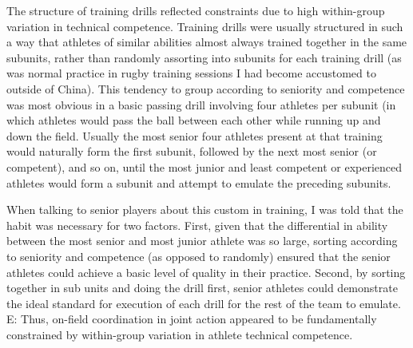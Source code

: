 \begin{CJK}{UTF8}{gbsn}
The structure of training drills reflected constraints due to high within-group variation in technical competence.  Training drills were usually structured in such a way that athletes of similar abilities almost always trained together in the same subunits, rather than randomly assorting into subunits for each training drill (as was normal practice in rugby training sessions I had become accustomed to outside of China).  This tendency to group according to seniority and competence was most obvious in a basic passing drill involving four athletes per subunit (in which athletes would pass the ball between each other while running up and down the field.  Usually the most senior four athletes present at that training would naturally form the first subunit, followed by the next most senior (or competent), and so on, until the most junior and least competent or experienced athletes would form a subunit and attempt to emulate the preceding subunits.

When talking to senior players about this custom in training, I was told that the habit was necessary for two factors.  First, given that the differential in ability between the most senior and most junior athlete was so large, sorting according to seniority and competence (as opposed to randomly) ensured that the senior athletes could achieve a basic level of quality in their practice.  Second, by sorting together in sub units and doing the drill first, senior athletes could demonstrate the ideal standard for execution of each drill for the rest of the team to emulate.
E: Thus, on-field coordination in joint action appeared to be fundamentally constrained by within-group variation in athlete technical competence.


\end{CJK}

